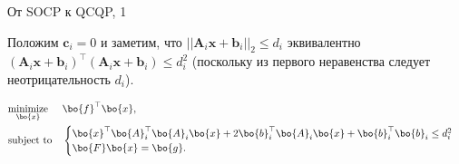 \documentclass{beamer}
\begin{document}
\begin{frame}{От SOCP к QCQP, 1}
	\begin{flushleft}
		
		Положим $\mathbf{c}_i = 0$ и заметим, что $||\mathbf{A}_i\mathbf{x} + \mathbf{b}_i||_2 \leq d_i$ эквивалентно $(\mathbf{A}_i\mathbf{x} + \mathbf{b}_i)^\top (\mathbf{A}_i\mathbf{x} + \mathbf{b}_i) \leq d_i^2$ (поскольку из первого неравенства следует неотрицательность $d_i$).
		
		\bigskip
		\begin{equation}
			\begin{aligned}
				& \underset{\bo{x}}{\text{minimize}}
				& & \bo{f}^\top\bo{x}, \\
				& \text{subject to}
				& & \begin{cases}
					\bo{x}^\top \bo{A}_i^\top \bo{A}_i \bo{x} + 
					2 \bo{b}_i^\top \bo{A}_i\bo{x} + 
					\bo{b}_i^\top \bo{b}_i  \leq d_i^2\\
					\bo{F}\bo{x} = \bo{g}.
				\end{cases}
			\end{aligned}
		\end{equation}
		
	\end{flushleft}
\end{frame}
\end{document}
